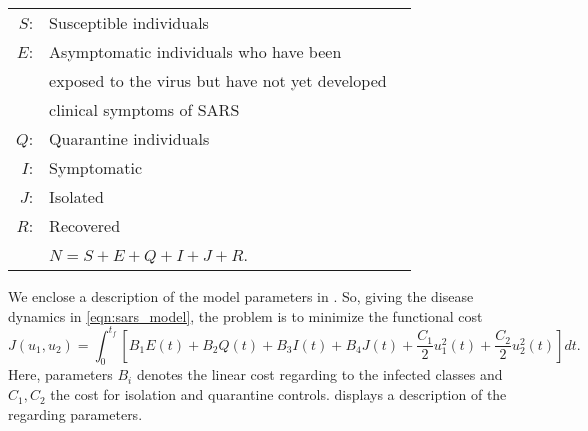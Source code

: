 \begin{table}[h!]
	\begin{center}
		\begin{tabular}{@{}rll@{}} 
			$S$: & Susceptible individuals 
			\\
			$E$: & Asymptomatic individuals who have been 
			\\
			   & exposed to the virus but have not yet developed 
			\\
			   & clinical symptoms of SARS 
			\\
			$Q$: & Quarantine individuals
			\\
			$I$: & Symptomatic 
			\\
			$J$: & Isolated
			\\
			$R$: & Recovered
			\\
				& $N = S + E + Q + I + J + R$.
		\end{tabular}
	\end{center}
\end{table}
We enclose a description of the model parameters 
in .
So, giving the disease dynamics in \eqref{eqn:sars_model}, the problem is to 
minimize the functional cost
\begin{equation}\label{eqn:sars_cost}
  J(u_1,u_2)
    = \int_{0}^{t_f}
      \left[
        B_1 E(t)
        + B_2 Q(t)
        + B_3 I(t)
        + B_4 J(t)
        + \frac{C_1}{2} u_1^2 (t)
        + \frac{C_2}{2} u_2^2 (t)
      \right]
      dt.
\end{equation}
Here, parameters $B_i$ denotes the linear cost regarding to the infected 
classes and $C_1, C_2$ the cost for isolation and quarantine controls.
 displays a description of the regarding parameters.
%
